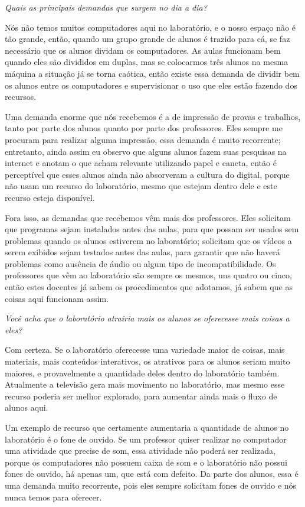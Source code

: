 \textit{Quais as principais demandas que surgem no dia a dia?}

Nós não temos muitos computadores aqui no laboratório, e o nosso espaço não é tão grande, então, quando um grupo grande de alunos é trazido para cá, se faz necessário que os alunos dividam os computadores. As aulas funcionam bem quando eles são divididos em duplas, mas se colocarmos três alunos na mesma máquina a situação já se torna caótica, então existe essa demanda de dividir bem os alunos entre os computadores e supervisionar o uso que eles estão fazendo dos recursos.

Uma demanda enorme que nós recebemos é a de impressão de provas e trabalhos, tanto por parte dos alunos quanto por parte dos professores. Eles sempre me procuram para realizar alguma impressão, essa demanda é muito recorrente; entretanto, ainda assim eu observo que alguns alunos fazem suas pesquisas na internet e anotam o que acham relevante utilizando papel e caneta, então é perceptível que esses alunos ainda não absorveram a cultura do digital, porque não usam um recurso do laboratório, mesmo que estejam dentro dele e este recurso esteja disponível.

Fora isso, as demandas que recebemos vêm mais dos professores. Eles solicitam que programas sejam instalados antes das aulas, para que possam ser usados sem problemas quando os alunos estiverem no laboratório; solicitam que os vídeos a serem exibidos sejam testados antes das aulas, para garantir que não haverá problemas como ausência de áudio ou algum tipo de incompatibilidade. Os professores que vêm ao laboratório são sempre os mesmos, uns quatro ou cinco, então estes docentes já sabem os procedimentos que adotamos, já sabem que as coisas aqui funcionam assim.

\textit{Você acha que o laboratório atrairia mais os alunos se oferecesse mais coisas a eles?}

Com certeza. Se o laboratório oferecesse uma variedade maior de coisas, mais materiais, mais conteúdos interativos, os atrativos para os alunos seriam muito maiores, e provavelmente a quantidade deles dentro do laboratório também. Atualmente a televisão gera mais movimento no laboratório, mas mesmo esse recurso poderia ser melhor explorado, para aumentar ainda mais o fluxo de alunos aqui.

Um exemplo de recurso que certamente aumentaria a quantidade de alunos no laboratório é o fone de ouvido. Se um professor quiser realizar no computador uma atividade que precise de som, essa atividade não poderá ser realizada, porque os computadores não possuem caixa de som e o laboratório não possui fones de ouvido, há apenas um, que está com defeito. Da parte dos alunos, essa é uma demanda muito recorrente, pois eles sempre solicitam fones de ouvido e nós nunca temos para oferecer.

